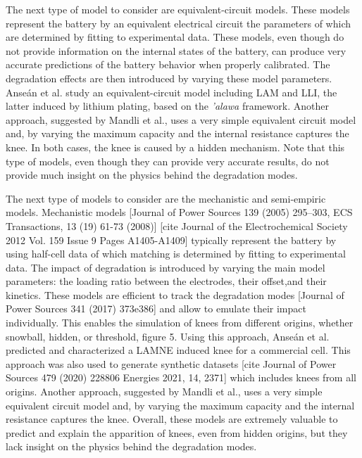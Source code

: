 \documentclass[journal=jpclcd,manuscript=article]{achemso}
\begin{document}
The next type of model to consider are equivalent-circuit models. These models represent the battery by an equivalent electrical circuit the parameters of which are determined by fitting to experimental data. These models, even though do not provide information on the internal states of the battery, can produce very accurate predictions of the battery behavior when properly calibrated. The degradation effects are then introduced by varying these model parameters. Anse\'an et al. \cite{ansean_operando_2017} study an equivalent-circuit model including LAM and LLI, the latter induced by lithium plating, based on the \emph{'alawa} framework\cite{dubarry_synthesize_2012}. Another approach, suggested by Mandli et al.,\cite{mandli_analysis_2019} uses a very simple equivalent circuit model and, by varying the maximum capacity and the internal resistance captures the knee. In both cases, the knee is caused by a hidden mechanism. Note that this type of models, even though they can provide very accurate results, do not provide much insight on the physics behind the degradation modes.

The next type of models to consider are the mechanistic and semi-empiric models. Mechanistic models [Journal of Power Sources 139 (2005) 295–303,  ECS Transactions, 13 (19) 61-73 (2008)] \cite{dubarry_synthesize_2012} [cite Journal of the Electrochemical Society  2012 Vol. 159 Issue 9 Pages A1405-A1409] typically represent the battery by using half-cell data of which matching is determined by fitting to experimental data. The impact of degradation is introduced by varying the main model parameters: the loading ratio between the electrodes, their offset,and their kinetics. These models are efficient to track the degradation modes \cite{dubarry_synthesize_2012}  [Journal of Power Sources 341 (2017) 373e386] and allow to emulate their impact individually. This enables the simulation of knees from different origins, whether snowball, hidden, or threshold, figure 5. Using this approach, Anse\'an et al. \cite{ansean_operando_2017} predicted and characterized a LAMNE induced knee for a commercial cell. This approach was also used to generate synthetic datasets [cite Journal of Power Sources 479 (2020) 228806 Energies 2021, 14, 2371] which includes knees from all origins. Another approach, suggested by Mandli et al.,\cite{mandli_analysis_2019} uses a very simple equivalent circuit model and, by varying the maximum capacity and the internal resistance captures the knee. Overall, these models are extremely valuable to predict and explain the apparition of knees, even from hidden origins, but they lack insight on the physics behind the degradation modes.
\end{document}
